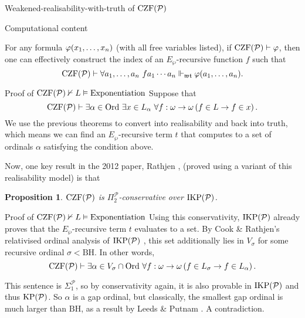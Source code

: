 \documentclass{beamer}
\newtheorem{proposition}{Proposition}
\theoremstyle{definition}
\newcommand{\CZF}{\mathrm{CZF}}
\newcommand{\CZFP}{\CZF\mleft(\mathcal{P}\mright)}
\newcommand{\IKP}{\mathrm{IKP}}
\newcommand{\IKPP}{\IKP\mleft(\mathcal{P}\mright)}
\newcommand{\Ord}{\mathrm{Ord}}
\begin{document}
\begin{frame}{Weakened-realisability-with-truth of $\CZFP$}
  \pause

  \only<3>{
    \begin{proposition}[Rathjen, 2012]
      For any formula $\varphi$, $\CZFP \vdash \left(\exists a \ a \Vdash_{\mathfrak{wt}} \varphi\right) \rightarrow \varphi$.
    \end{proposition}
  }
\end{frame}

\begin{frame}{Computational content}
  \begin{theorem}[Rathjen, 2012]
    For any formula $\varphi\mleft(x_1, \ldots, x_n\mright)$ (with all free variables listed), if $\CZFP \vdash \varphi$, then one can effectively construct the index of an $E_\wp$-recursive function $f$ such that
    \[\CZFP \vdash \forall a_1, \ldots, a_n \ f a_1 \cdots a_n \Vdash_{\mathfrak{wt}} \varphi\mleft(a_1, \ldots, a_n\mright).\]
  \end{theorem}
\end{frame}

\begin{frame}{Proof of $\CZFP \nvdash L \vDash \text{Exponentiation}$}
  Suppose that
  \[\CZFP \vdash \exists \alpha \in \Ord \ \exists x \in L_\alpha \ \forall f : \omega \rightarrow \omega \left(f \in L \rightarrow f \in x\right).\]
  We use the previous theorems to convert into realisability and back into truth, which means we can find an $E_\wp$-recursive term $t$ that computes to a set of ordinals $\alpha$ satisfying the condition above.

  \pause

  \vspace{1em}
  Now, one key result in the 2012 paper, Rathjen \cite{rathjen12-weak-strong-existence-property}, (proved using a variant of this realisability model) is that
  \begin{proposition}
    $\CZFP$ is $\Pi_2^\mathcal{P}$-conservative over $\IKPP$.
  \end{proposition}
\end{frame}

\begin{frame}{Proof of $\CZFP \nvdash L \vDash \text{Exponentiation}$}
  Using this conservativity, $\IKPP$ already proves that the $E_\wp$-recursive term $t$ evaluates to a set. By Cook \& Rathjen's relativised ordinal analysis of $\IKPP$ \cite{cook-rathjen16-ikp-power-exp}, this set additionally lies in $V_\sigma$ for some recursive ordinal $\sigma < \text{BH}$. In other words,
  \[\CZFP \vdash \exists \alpha \in V_\sigma \cap \Ord \ \forall f : \omega \rightarrow \omega \left(f \in L_\sigma \rightarrow f \in L_\alpha\right).\]

  This sentence is $\Sigma_1^\mathcal{P}$, so by conservativity again, it is also provable in $\IKPP$ and thus $\mathrm{KP}\mleft(\mathcal{P}\mright)$. So $\alpha$ is a gap ordinal, but classically, the smallest gap ordinal is much larger than $\text{BH}$, as a result by Leeds \& Putnam \cite{leeds-putnam71-constructible-sets}. A contradiction.
\end{frame}
\end{document}
